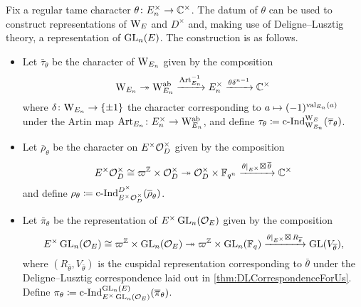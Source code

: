 \documentclass[../main.tex]{subfiles}
\begin{document}
Fix a regular tame character $\theta\colon  E_n^\times \to \mathbb{C}^\times$. 
The datum of $\theta$ can be used to construct representations 
of $\mathrm W_E$ and $D^\times$ and, making use of Deligne--Lusztig
theory, a representation of $\operatorname{GL}_n(E)$. The construction is as follows.
\begin{itemize}
  \item Let $\bar \tau_\theta$ be the character of $\mathrm W_{E_n}$ given by 
    the composition
    \begin{equation*}
      \mathrm W_{E_n} \twoheadrightarrow \mathrm W_{E_n}^{\mathrm{ab}} \xrightarrow{\operatorname{Art}_{E_n}^{-1}} E_n^\times \xrightarrow{\theta \delta^{n-1}} \mathbb{C}^\times
    \end{equation*}
    where $\delta\colon \mathrm W_{E_n} \to \{\pm 1\}$ the character corresponding to
    $a \mapsto (-1)^{\mathrm{val}_{E_n}(a)}$ under the Artin map $\operatorname{Art}_{E_n}\colon
    E_n^\times \to \mathrm W_{E_n}^{\mathrm{ab}}$,
    and define $\tau_\theta \coloneqq \operatorname{c\text{-}Ind}_{\mathrm W_{E_n}}^{\mathrm W_E}(\overline \tau_\theta)$.

  \item Let $\bar \rho_\theta$ be the character on 
    $E^\times \mathcal{O}_D^\times$ given by the composition
    \begin{equation*}
      E^\times\mathcal{O}_D^\times \cong \varpi^{\mathbb{Z}} \times \mathcal{O}_D^\times \twoheadrightarrow 
      \mathcal{O}_D^\times \times \mathbb{F}_{q^n} \xrightarrow{\theta|_{E^\times} \boxtimes \,
      \overline \theta} \mathbb{C}^\times
    \end{equation*}
    and define $\rho_\theta \coloneqq \operatorname{c\text{-}Ind}_{E^\times
    \mathcal{O}_D^\times}^{D^\times}(\overline \rho_\theta)$.

  \item Let $\bar \pi_\theta$ be the representation of $E^\times \operatorname{GL}_n(\mathcal{O}_E)$
    given by the composition
    \begin{equation*}
      E^\times \operatorname{GL}_n(\mathcal{O}_E) \cong \varpi^{\mathbb{Z}} \times \operatorname{GL}_n(\mathcal{O}_E)
      \twoheadrightarrow \varpi^{\mathbb{Z}} \times \operatorname{GL}_n(\mathbb{F}_q) \xrightarrow{\theta|_{E^\times} \boxtimes \, 
      R_{\overline\theta}} \operatorname{GL}(V_{\overline \theta}),
    \end{equation*}
    where $(R_{\bar \theta}, V_{\bar \theta})$ is the cuspidal representation 
    corresponding to $\bar \theta$ under the Deligne--Lusztig correspondence laid out
    in \cref{thm:DLCorrespondenceForUs}.
    Define $\pi_\theta \coloneqq \operatorname{c\text{-}Ind}_{E^\times \operatorname{GL}_n(\mathcal{O}_E)}^{\operatorname{GL}_n(E)}(\overline
    \pi_\theta)$. 
\end{itemize}
\end{document}
